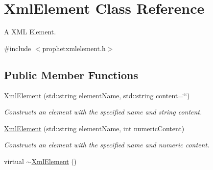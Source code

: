 \hypertarget{classXmlElement}{
\section{XmlElement Class Reference}
\label{classXmlElement}
}


A XML Element.  




{\ttfamily \#include $<$prophetxmlelement.h$>$}

\subsection*{Public Member Functions}
\begin{DoxyCompactItemize}
\item 
\hyperlink{classXmlElement_a94d6c15e996994d62316b198f369d675}{XmlElement} (std::string elementName, std::string content=\char`\"{}\char`\"{})
\begin{DoxyCompactList}\small\item\em Constructs an element with the specified name and string content. \item\end{DoxyCompactList}\item 
\hyperlink{classXmlElement_a879b90d96dc87b6f7ebb9c67ba92cb73}{XmlElement} (std::string elementName, int numericContent)
\begin{DoxyCompactList}\small\item\em Constructs an element with the specified name and numeric content. \item\end{DoxyCompactList}\item 
\hypertarget{classXmlElement_a1e67b1dfcd561d1d602988d100d80d9b}{
virtual \hyperlink{classXmlElement_a1e67b1dfcd561d1d602988d100d80d9b}{$\sim$XmlElement} ()}
\label{classXmlElement_a1e67b1dfcd561d1d602988d100d80d9b}


\end{DoxyCompactItemize}
